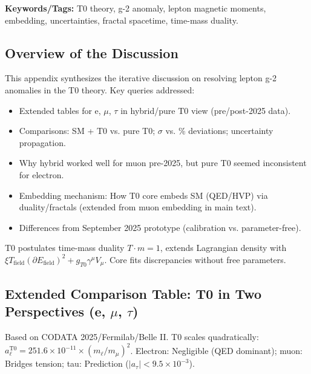 \documentclass[12pt,a4paper]{article}
\begin{document}
	\textbf{Keywords/Tags:} T0 theory, g-2 anomaly, lepton magnetic moments, embedding, uncertainties, fractal spacetime, time-mass duality.
	
	\subsection{Overview of the Discussion}
	
	This appendix synthesizes the iterative discussion on resolving lepton g-2 anomalies in the T0 theory. Key queries addressed:
	\begin{itemize}
		\item Extended tables for e, $\mu$, $\tau$ in hybrid/pure T0 view (pre/post-2025 data).
		\item Comparisons: SM + T0 vs. pure T0; $\sigma$ vs. \% deviations; uncertainty propagation.
		\item Why hybrid worked well for muon pre-2025, but pure T0 seemed inconsistent for electron.
		\item Embedding mechanism: How T0 core embeds SM (QED/HVP) via duality/fractals (extended from muon embedding in main text).
		\item Differences from September 2025 prototype (calibration vs. parameter-free).
	\end{itemize}
	
	T0 postulates time-mass duality $T \cdot m = 1$, extends Lagrangian density with $\xi T_\text{field} (\partial E_\text{field})^2 + g_{T0} \gamma^\mu V_\mu$. Core fits discrepancies without free parameters.
	
	\subsection{Extended Comparison Table: T0 in Two Perspectives (e, $\mu$, $\tau$)}
	
	Based on CODATA 2025/Fermilab/Belle II. T0 scales quadratically: $a_\ell^\text{T0} = 251.6 \times 10^{-11} \times (m_\ell / m_\mu)^2$. Electron: Negligible (QED dominant); muon: Bridges tension; tau: Prediction ($|a_\tau| < 9.5 \times 10^{-3}$).
	
\end{document}
